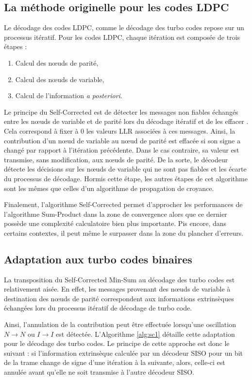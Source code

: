 \subsection{La méthode originelle pour les codes LDPC}
Le décodage des codes LDPC, comme le décodage des turbo codes repose sur un processus itératif. Pour les codes LDPC,
chaque itération est composée de trois étapes : 
\begin{enumerate}
	\item Calcul des nœuds de parité,%
	\item Calcul des nœuds de variable,%
	\item Calcul de l'information \textit{a posteriori}.%
\end{enumerate}
Le principe du Self-Corrected est de détecter les messages non fiables échangés entre les nœuds de variable et de parité 
lors du décodage itératif et de les \og 
effacer \fg. Cela correspond à fixer à 0 les valeurs LLR associées à ces messages. Ainsi, la contribution d'un nœud de 
variable au nœud de parité est effacée si son signe a changé par rapport à l’itération précédente. Dans le cas contraire, sa 
valeur est transmise, sans modification, aux nœuds de 
parité. De la sorte, le décodeur détecte les décisions sur les nœuds de variable qui ne sont pas fiables et les écarte du processus de décodage. Hormis cette 
étape, les autres étapes de cet algorithme sont les mêmes que celles d'un algorithme de propagation de croyance.

Finalement, l'algorithme Self-Corrected permet d'approcher les performances de l'algorithme Sum-Product dans la zone de convergence alors
que ce dernier possède une complexité calculatoire bien plus importante. Pis encore, dans certains contextes, il peut même le 
surpasser dans la zone du plancher d'erreurs.

\subsection{Adaptation aux turbo codes binaires}
La transposition du Self-Corrected Min-Sum au décodage des turbo codes est relativement aisée. En effet, les messages provenant 
des nœuds de variable à destination des nœuds de parité correspondent aux informations extrinsèques échangées lors 
du processus itératif de décodage de turbo code.

Ainsi, l'annulation de la contribution peut être effectuée lorsqu'une oscillation $N \rightarrow N$ ou $I \rightarrow I$ est détectée.
L'Algorithme \ref{alg:sc1} détaille cette adaptation pour le décodage des turbo codes. Le principe de cette approche est 
donc le suivant : si l’information extrinsèque calculée par un décodeur SISO pour un bit de la trame change de 
signe d’une itération à la suivante, alors, celle-ci est annulée avant qu’elle ne soit transmise à l’autre 
décodeur SISO.

